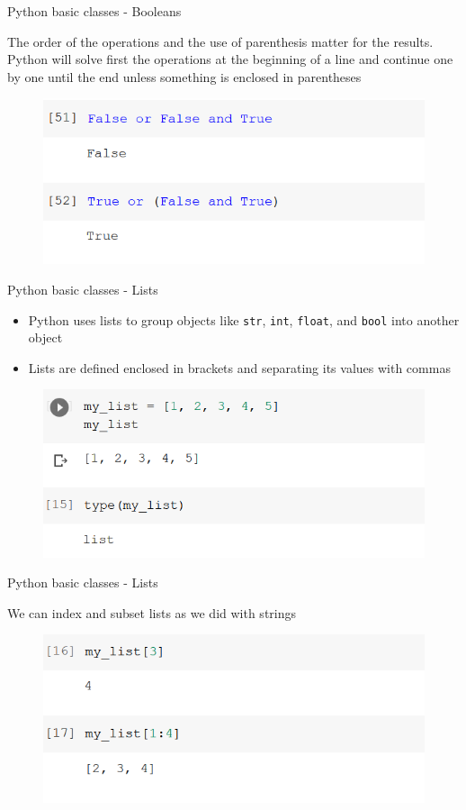 \documentclass[aspectratio=169]{beamer}
\begin{document}
\begin{frame}{Python basic classes - Booleans}

	The order of the operations and the use of parenthesis matter for the results. Python will solve first the operations at the beginning of a line and continue one by one until the end unless something is enclosed in parentheses

	\begin{figure}
		\centering
		\includegraphics[width=0.6\linewidth]{img/bool_operations.png}
	\end{figure}

\end{frame}

\begin{frame}{Python basic classes - Lists}

	\begin{itemize}
		\item Python uses lists to group objects like \texttt{str}, \texttt{int}, \texttt{float}, and \texttt{bool} into another object
		\item Lists are defined enclosed in brackets and separating its values with commas
	\end{itemize}

	\begin{figure}
		\centering
		\includegraphics[width=0.6\linewidth]{img/list_type.png}
	\end{figure}

\end{frame}

\begin{frame}{Python basic classes - Lists}

	We can index and subset lists as we did with strings

	\begin{figure}
		\centering
		\includegraphics[width=0.6\linewidth]{img/list_subset.png}
	\end{figure}

\end{frame}
\end{document}

